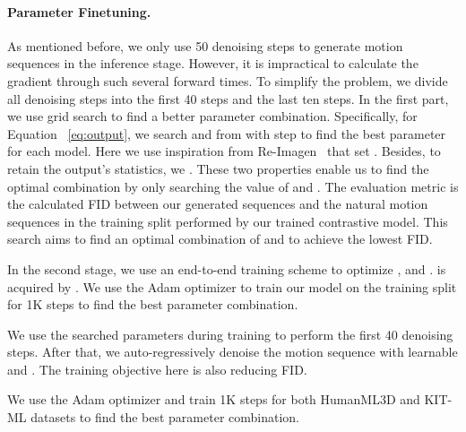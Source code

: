 \documentclass[10pt,twocolumn,letterpaper]{article}
\begin{document}
\noindent\paragraph{Parameter Finetuning.} As mentioned before, we only use 50 denoising steps to generate motion sequences in the inference stage. However, it is impractical to calculate the gradient through such several forward times. To simplify the problem, we divide all denoising steps into the first 40 steps and the last ten steps. In the first part, we use grid search to find a better parameter combination. Specifically, for Equation ~\ref{eq:output}, we search  and  from  with step  to find the best parameter for each model. Here we use inspiration from Re-Imagen~\cite{chen2022re} that set . Besides, to retain the output's statistics, we . These two properties enable us to find the optimal combination by only searching the value of  and . The evaluation metric is the calculated FID between our generated sequences and the natural motion sequences in the training split performed by our trained contrastive model. This search aims to find an optimal combination of  and  to achieve the lowest FID.

In the second stage, we use an end-to-end training scheme to optimize , and .  is acquired by . We use the Adam optimizer to train our model on the training split for 1K steps to find the best parameter combination.

We use the searched parameters during training to perform the first 40 denoising steps. After that, we auto-regressively denoise the motion sequence with learnable  and . The training objective here is also reducing FID.

We use the Adam optimizer and train 1K steps for both HumanML3D and KIT-ML datasets to find the best parameter combination.
\end{document}

